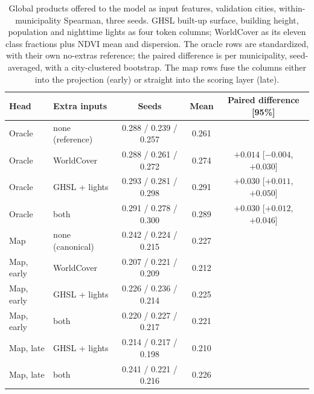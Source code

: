 \documentclass[11pt]{article}
\begin{document}
\begin{table}[h]
\centering
\caption{Global products offered to the model as input features, validation cities,
within-municipality Spearman, three seeds. GHSL built-up surface, building height,
population and nighttime lights as four token columns; WorldCover as its eleven class
fractions plus NDVI mean and dispersion. The oracle rows are standardized, with their
own no-extras reference; the paired difference is per municipality, seed-averaged, with a
city-clustered bootstrap. The map rows fuse the columns either into the projection
(early) or straight into the scoring layer (late).}
\begin{tabular}{llccc}
\toprule
Head & Extra inputs & Seeds & Mean & Paired difference [95\%]\\
\midrule
Oracle & none (reference) & 0.288 / 0.239 / 0.257 & 0.261 & \\
Oracle & WorldCover & 0.288 / 0.261 / 0.272 & 0.274 & $+0.014$ [$-0.004$, $+0.030$]\\
Oracle & GHSL + lights & 0.293 / 0.281 / 0.298 & 0.291 & $+0.030$ [$+0.011$, $+0.050$]\\
Oracle & both & 0.291 / 0.278 / 0.300 & 0.289 & $+0.030$ [$+0.012$, $+0.046$]\\
\midrule
Map & none (canonical) & 0.242 / 0.224 / 0.215 & 0.227 & \\
Map, early & WorldCover & 0.207 / 0.221 / 0.209 & 0.212 & \\
Map, early & GHSL + lights & 0.226 / 0.236 / 0.214 & 0.225 & \\
Map, early & both & 0.220 / 0.227 / 0.217 & 0.221 & \\
Map, late & GHSL + lights & 0.214 / 0.217 / 0.198 & 0.210 & \\
Map, late & both & 0.241 / 0.221 / 0.216 & 0.226 & \\
\bottomrule
\end{tabular}
\end{table}
\end{document}
